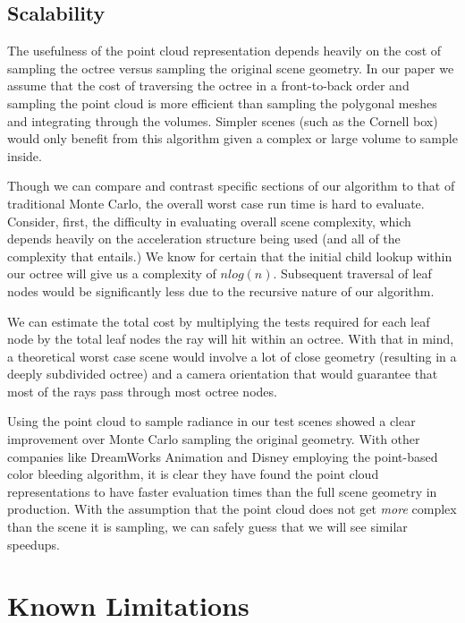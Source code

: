 \documentclass[12pt]{ucthesis}
\begin{document}
\subsection{Scalability}

The usefulness of the point cloud representation depends heavily on the cost of sampling the octree versus sampling the original scene geometry.  In our paper we assume that the cost of traversing the octree in a front-to-back order and sampling the point cloud is more efficient than sampling the polygonal meshes and integrating through the volumes.  Simpler scenes (such as the Cornell box) would only benefit from this algorithm given a complex or large volume to sample inside.

Though we can compare and contrast specific sections of our algorithm to that of traditional Monte Carlo, the overall worst case run time is hard to evaluate.  Consider, first, the difficulty in evaluating overall scene complexity, which depends heavily on the acceleration structure being used (and all of the complexity that entails.)  We know for certain that the initial child lookup within our octree will give us a complexity of $n log(n)$.  Subsequent traversal of leaf nodes would be significantly less due to the recursive nature of our algorithm.

We can estimate the total cost by multiplying the tests required for each leaf node by the total leaf nodes the ray will hit within an octree.  With that in mind, a theoretical worst case scene would involve a lot of close geometry (resulting in a deeply subdivided octree) and a camera orientation that would guarantee that most of the rays pass through most octree nodes.

Using the point cloud to sample radiance in our test scenes showed a clear improvement over Monte Carlo sampling the original geometry.  With other companies like DreamWorks Animation and Disney employing the point-based color bleeding algorithm, it is clear they have found the point cloud representations to have faster evaluation times than the full scene geometry in production.  With the assumption that the point cloud does not get \textit{more} complex than the scene it is sampling, we can safely guess that we will see similar speedups.


\section{Known Limitations}
\label{sec:knownlimits}
\end{document}
